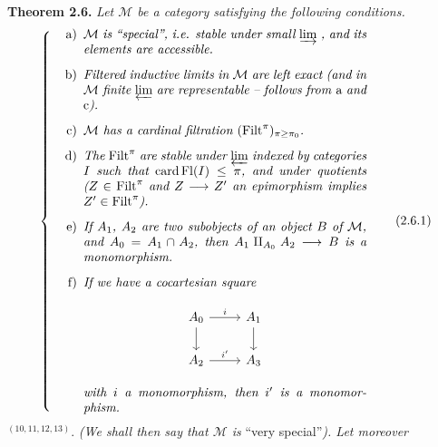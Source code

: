 \documentclass[11pt]{article}
\newcommand{\msp}[1]{\marginpar{\footnotesize [#1]}}
\newcommand{\Fl}{\mathrm{Fl}}
\newcommand{\Filt}{\mathrm{Filt}}
\begin{document}
\msp{page 25}
\textbf{Theorem 2.6.} \textit{Let $\mathcal{M}$ be a category satisfying the following conditions.}
\[ \left\{ \begin{minipage}{0.72\textwidth}\itshape
\begin{itemize}[leftmargin=2.5em]
\item[\upshape a)] $\mathcal{M}$ is ``special'', i.e. stable under small $\varinjlim$ , and its elements are accessible.
\item[\upshape b)] Filtered inductive limits in $\mathcal{M}$ are left exact (and in $\mathcal{M}$ finite $\varprojlim$ are representable – follows from \textup{a} and \textup{c}).
\item[\upshape c)] $\mathcal{M}$ has a cardinal filtration $(\Filt^\pi)_{\pi\geq\pi_0}$.
\item[\upshape d)] The $\Filt^\pi$ are stable under $\varprojlim$ indexed by categories $I$ such that $\operatorname{card}\Fl(I) \leq \pi$, and under quotients ($Z \in \Filt^\pi$ and $Z \longrightarrow Z'$ an epimorphism implies $Z' \in \Filt^\pi$).
\item[\upshape e)] If $A_1$, $A_2$ are two subobjects of an object $B$ of $\mathcal{M}$, and $A_0 = A_1 \cap A_2$, then $A_1 \amalg_{A_0} A_2 \longrightarrow B$ is a monomorphism.
\item[\upshape f)] If we have a cocartesian square
\begin{center}
\begin{tikzcd}
A_0 \arrow[r, "i"] \arrow[d] & A_1 \arrow[d] \\
A_2 \arrow[r, "i'"] & A_3
\end{tikzcd}
\end{center}
with $i$ a monomorphism, then $i'$ is a monomorphism.
\end{itemize}
\end{minipage}\right. \tag*{(2.6.1)} \]
$^{(10,11,12,13)}$. \textit{(We shall then say that $\mathcal{M}$ is} ``very special''\textit{). Let moreover}
\end{document}
